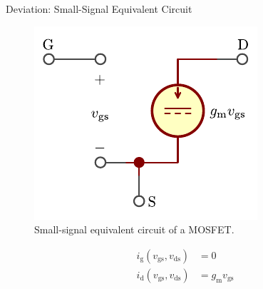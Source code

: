 \begin{frame}{Deviation: Small-Signal Equivalent Circuit}
    \begin{figure}
        \centering
        \includegraphics{../assets/small_signal.pdf}
        \caption{Small-signal equivalent circuit of a MOSFET.}
        \label{fig:mosfet_small_signal_model}
    \end{figure}
    \begin{align*}
        i_{\mathrm{g}}(v_{\mathrm{gs}}, v_{\mathrm{ds}}) &= 0 \\
        i_{\mathrm{d}}(v_{\mathrm{gs}}, v_{\mathrm{ds}}) &= g_{\mathrm{m}}v_{\mathrm{gs}}
    \end{align*}
\end{frame}
